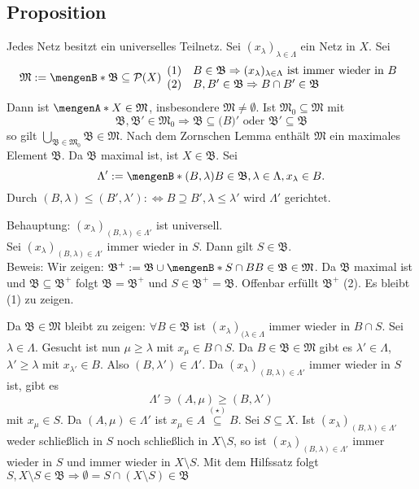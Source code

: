 \subsection[Proposition: Jedes Netzt besitzt universelles Teilnetz]{Proposition} %
\label{sub:412}
Jedes Netz besitzt ein universelles Teilnetz.
Sei $(x_\lambda )_{\lambda  \in \Lambda}$ ein Netz in $X$. Sei 
\[
	\mathfrak{M} := \set[\mathfrak{B} \subseteq \mathcal{P}(X) ]{
	\begin{array}{ll}
		(1) & B \in \mathfrak{B} \Rightarrow (x_\lambda )_{\lambda  \in \Lambda} \text{ ist immer wieder in } B \\
		(2) & B, B' \in \mathfrak{B} \Rightarrow B \cap B' \in \mathfrak{B}
	\end{array}
	} 
\]
Dann ist $\set{X} \in \mathfrak{M}$, insbesondere $\mathfrak{M} \not= \emptyset$. Ist $\mathfrak{M}_0 \subseteq \mathfrak{M}$ mit 
\[
	\mathfrak{B}, \mathfrak{B}' \in \mathfrak{M}_0 \Rightarrow \mathfrak{B} \subseteq \mathfrak(B)' \text{ oder } \mathfrak{B'} \subseteq \mathfrak{B}
\]
so gilt $\bigcup_{\mathfrak{B \in \mathfrak{M}_0}} \mathfrak{B} \in \mathfrak{M}$. Nach dem Zornschen Lemma enthält $\mathfrak{M}$ ein maximales Element $\mathfrak{B}$.
Da $\mathfrak{B}$ maximal ist, ist $X \in \mathfrak{B}$. Sei 
\[
	\Lambda' := \set[(B,\lambda )]{B \in \mathfrak{B}, \lambda \in \Lambda, x_\lambda  \in B}. 
\]
Durch $(B,\lambda ) \le (B', \lambda ') :\Leftrightarrow B \supseteq B', \lambda  \le \lambda '$ wird $\Lambda'$ gerichtet.

Behauptung: $(x_\lambda )_{(B,\lambda)  \in \Lambda'}$ ist universell. \\
Sei $(x_\lambda )_{(B,\lambda)  \in \Lambda'}$ immer wieder in $S$. Dann gilt $S \in \mathfrak{B}$. \\
Beweis: Wir zeigen: $\mathfrak{B}^+ := \mathfrak{B} \cup \set[S \cap B]{B \in \mathfrak{B}}  \in \mathfrak{M}$. Da $\mathfrak{B}$ maximal ist und 
$\mathfrak{B} \subseteq \mathfrak{B}^+$ folgt $\mathfrak{B} = \mathfrak{B}^+$ und $S \in \mathfrak{B}^+ =\mathfrak{B}$. 
Offenbar erfüllt $\mathfrak{B}^+$ (2). Es bleibt (1) zu zeigen.

Da $\mathfrak{B} \in \mathfrak{M}$ bleibt zu zeigen: $\forall B \in \mathfrak{B}$ ist $(x_\lambda )_{(\lambda \in \Lambda}$ immer wieder in $B \cap S$. Sei 
$\lambda \in \Lambda$. Gesucht ist nun $\mu \ge \lambda $ mit $x_\mu \in B \cap S$. Da $B \in \mathfrak{B} \in \mathfrak{M}$ gibt es $\lambda ' \in \Lambda$, 
$\lambda ' \ge \lambda $ mit $x_{\lambda'} \in B$. Also $(B, \lambda') \in \Lambda'$. Da $(x_\lambda )_{(B,\lambda)  \in \Lambda'}$ immer wieder in $S$ ist, gibt es
\[
	\Lambda' \ni (A, \mu) \ge (B,\lambda ') \tag{$\star$}
\]
mit $x_{\mu} \in S$. Da $(A,\mu) \in \Lambda'$ ist $x_\mu \in A \stackrel{(\star)}{\subseteq} B$. Sei $S \subseteq X$. Ist $(x_\lambda )_{(B,\lambda)  \in \Lambda'}$
weder schließlich in $S$ noch schließlich in $X \setminus S$, so ist $(x_\lambda )_{(B,\lambda)  \in \Lambda'}$ immer wieder in $S$ und immer wieder in $X \setminus S$.
Mit dem Hilfssatz folgt $S, X \setminus S \in \mathfrak{B} \Rightarrow \emptyset = S \cap (X \setminus S) \in \mathfrak{B}$ \light \bewende

